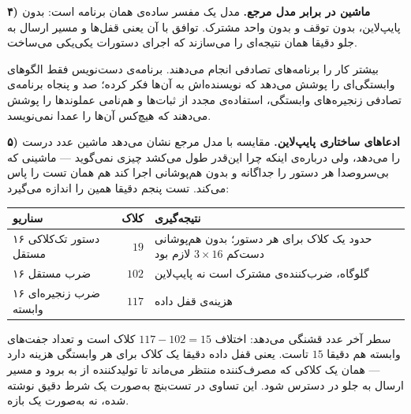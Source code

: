 \documentclass[10pt,a4paper]{article}
\begin{document}
\begin{latin}

\end{latin}

\begin{latin}

\end{latin}

\textbf{۴) ماشین در برابر مدل مرجع.} مدل یک مفسر ساده‌ی همان برنامه است: بدون پایپ‌لاین، بدون توقف و بدون واحد مشترک. توافق با آن یعنی قفل‌ها و مسیر ارسال به جلو دقیقا همان نتیجه‌ای را می‌سازند که اجرای دستورات یکی‌یکی می‌ساخت.

بیشتر کار را {برنامه‌های تصادفی} انجام می‌دهند. برنامه‌ی دست‌نویس فقط الگوهای وابستگی‌ای را پوشش می‌دهد که نویسنده‌اش به آن‌ها فکر کرده؛ صد و پنجاه برنامه‌ی تصادفی زنجیره‌های وابستگی، استفاده‌ی مجدد از ثبات‌ها و هم‌نامی عملوندها را پوشش می‌دهند که هیچ‌کس آن‌ها را عمدا نمی‌نویسد.

\begin{latin}

\end{latin}

\textbf{۵) ادعاهای ساختاری پایپ‌لاین.} مقایسه با مدل مرجع نشان می‌دهد ماشین عدد {درست} را می‌دهد، ولی درباره‌ی اینکه {چرا} این‌قدر طول می‌کشد چیزی نمی‌گوید — ماشینی که بی‌سروصدا هر دستور را جداگانه و بدون هم‌پوشانی اجرا کند هم همان تست را پاس می‌کند. تست پنجم دقیقا همین را اندازه می‌گیرد:

\begin{center}
\begin{tabular}{@{}l r p{6.0cm}@{}}
\toprule
{سناریو} & {کلاک} & {نتیجه‌گیری} \\
\midrule
۱۶ دستور تک‌کلاکی مستقل    & $19$  & حدود یک کلاک برای هر دستور؛ بدون هم‌پوشانی دست‌کم $3\times16$ لازم بود \\
۱۶ ضرب مستقل               & $102$ & گلوگاه، ضرب‌کننده‌ی مشترک است نه پایپ‌لاین \\
۱۶ ضرب زنجیره‌ای وابسته     & $117$ & هزینه‌ی قفل داده \\
\bottomrule
\end{tabular}
\end{center}

سطر آخر عدد قشنگی می‌دهد: اختلاف $117 - 102 = 15$ کلاک است و تعداد جفت‌های وابسته هم دقیقا $15$ تاست. یعنی قفل داده {دقیقا یک کلاک} برای هر وابستگی هزینه دارد — همان یک کلاکی که مصرف‌کننده منتظر می‌ماند تا تولیدکننده از  به  برود و مسیر ارسال به جلو در دسترس شود. این تساوی در تست‌بنچ به‌صورت یک شرط دقیق نوشته شده، نه به‌صورت یک بازه.
\end{document}
